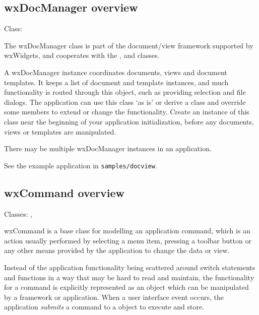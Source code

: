 \subsection{wxDocManager overview}\label{wxdocmanageroverview}


Class: 

The wxDocManager class is part of the document/view framework supported by wxWidgets,
and cooperates with the , \rtfsp
and  classes.

A wxDocManager instance coordinates documents, views and document templates. It keeps a list of document 
and template instances, and much functionality is routed through this object, such
as providing selection and file dialogs. The application can use this class `as is' or
derive a class and override some members to extend or change the functionality.
Create an instance of this class near the beginning of your application initialization,
before any documents, views or templates are manipulated.

There may be multiple wxDocManager instances in an application.

See the example application in {\tt samples/docview}.

\subsection{wxCommand overview}\label{wxcommandoverview}


Classes: , 

wxCommand is a base class for modelling an application command,
which is an action usually performed by selecting a menu item, pressing
a toolbar button or any other means provided by the application to
change the data or view.

Instead of the application functionality being scattered around
switch statements and functions in a way that may be hard to
read and maintain, the functionality for a command is explicitly represented
as an object which can be manipulated by a framework or application.
When a user interface event occurs, the application {\it submits} a command
to a  object to execute and
store.

